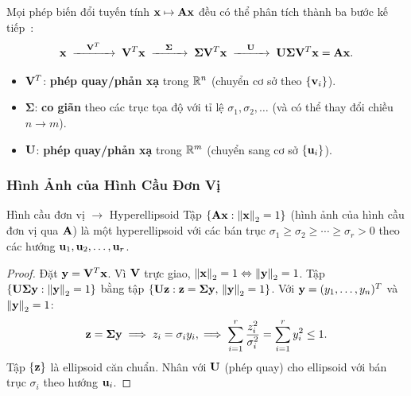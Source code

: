 Mọi phép biến đổi tuyến tính $\mathbf{x} \mapsto \mathbf{A}\mathbf{x}$ đều có thể phân
tích thành ba bước kế tiếp~\cite{strang2023}:
\[
    \mathbf{x}
    \;\xrightarrow{\quad\mathbf{V}^T\quad}\;
    \mathbf{V}^T\mathbf{x}
    \;\xrightarrow{\quad\boldsymbol{\Sigma}\quad}\;
    \boldsymbol{\Sigma}\mathbf{V}^T\mathbf{x}
    \;\xrightarrow{\quad\mathbf{U}\quad}\;
    \mathbf{U}\boldsymbol{\Sigma}\mathbf{V}^T\mathbf{x} = \mathbf{A}\mathbf{x}.
\]
\begin{itemize}[noitemsep]
    \item $\mathbf{V}^T$: \textbf{phép quay/phản xạ} trong $\mathbb{R}^n$ (chuyển cơ sở
          theo $\{\mathbf{v}_i\}$).
    \item $\boldsymbol{\Sigma}$: \textbf{co giãn} theo các trục tọa độ với tỉ lệ
          $\sigma_1, \sigma_2, \ldots$ (và có thể thay đổi chiều $n \to m$).
    \item $\mathbf{U}$: \textbf{phép quay/phản xạ} trong $\mathbb{R}^m$ (chuyển sang cơ sở
          $\{\mathbf{u}_i\}$).
\end{itemize}

\subsubsection{Hình Ảnh của Hình Cầu Đơn Vị}

\begin{mythm}{Hình cầu đơn vị $\to$ Hyperellipsoid}{}
Tập $\{\mathbf{A}\mathbf{x} : \left\lVert\mathbf{x}\right\rVert_2 = 1\}$ (hình ảnh của hình cầu đơn vị
qua $\mathbf{A}$) là một hyperellipsoid với các bán trục $\sigma_1 \geq \sigma_2 \geq
\cdots \geq \sigma_r > 0$ theo các hướng $\mathbf{u}_1, \mathbf{u}_2, \ldots, \mathbf{u}_r$.
\end{mythm}

\begin{proof}
Đặt $\mathbf{y} = \mathbf{V}^T\mathbf{x}$. Vì $\mathbf{V}$ trực giao, $\left\lVert\mathbf{x}\right\rVert_2 = 1
\Leftrightarrow \left\lVert\mathbf{y}\right\rVert_2 = 1$.
Tập $\{\mathbf{U}\boldsymbol{\Sigma}\mathbf{y} : \left\lVert\mathbf{y}\right\rVert_2 = 1\}$ bằng tập
$\{\mathbf{U}\mathbf{z} : \mathbf{z} = \boldsymbol{\Sigma}\mathbf{y},\, \left\lVert\mathbf{y}\right\rVert_2 = 1\}$.
Với $\mathbf{y} = (y_1, \ldots, y_n)^T$ và $\left\lVert\mathbf{y}\right\rVert_2 = 1$:
\[
    \mathbf{z} = \boldsymbol{\Sigma}\mathbf{y}
    \implies z_i = \sigma_i y_i,
    \implies \sum_{i=1}^r \frac{z_i^2}{\sigma_i^2} = \sum_{i=1}^r y_i^2 \leq 1.
\]
Tập $\{\mathbf{z}\}$ là ellipsoid căn chuẩn. Nhân với $\mathbf{U}$ (phép quay) cho
ellipsoid với bán trục $\sigma_i$ theo hướng $\mathbf{u}_i$.
\end{proof}

